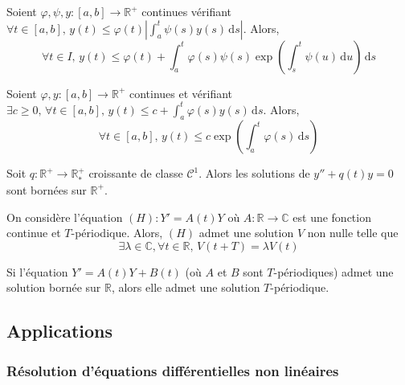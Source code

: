 
  \begin{lemma}
    Soient $\varphi, \psi, y : [a,b] \rightarrow \mathbb{R}^+$ continues vérifiant $\forall t \in [a,b], \, y(t) \leq \varphi(t) \left | \int_a^t \psi(s) y(s) \, \mathrm{d}s \right |$. Alors,
    \[ \forall t \in I, \, y(t) \leq \varphi(t) + \int_a^t \varphi(s) \psi(s) \exp \left( \int_s^t \psi(u) \, \mathrm{d}u \right) \, \mathrm{d}s \]
  \end{lemma}

  \begin{corollary}
    Soient $\varphi, y : [a,b] \rightarrow \mathbb{R}^+$  continues et vérifiant $\exists c \geq 0, \, \forall t \in [a, b], \, y(t) \leq c + \int_a^t \varphi(s) y(s) \, \mathrm{d}s$. Alors,
    \[ \forall t \in [a,b], \, y(t) \leq c \exp \left( \int_a^t \varphi(s) \, \mathrm{d}s \right) \]
  \end{corollary}

  \begin{application}
    Soit $q : \mathbb{R}^+ \rightarrow \mathbb{R}^+_*$ croissante de classe $\mathcal{C}^1$. Alors les solutions de $y'' + q(t) y = 0$ sont bornées sur $\mathbb{R}^+$.
  \end{application}


  \begin{theorem}
    On considère l'équation $(H) : Y' = A(t) Y$ où $A : \mathbb{R} \rightarrow \mathbb{C}$ est une fonction continue et $T$-périodique. Alors, $(H)$ admet une solution $V$ non nulle telle que
    \[ \exists \lambda \in \mathbb{C}, \forall t \in \mathbb{R}, \, V(t+T) = \lambda V(t) \]
  \end{theorem}


  \begin{theorem}
    Si l'équation $Y' = A(t) Y + B(t)$ (où $A$ et $B$ sont $T$-périodiques) admet une solution bornée sur $\mathbb{R}$, alors elle admet une solution $T$-périodique.
  \end{theorem}

  \subsection{Applications}

  \subsubsection{Résolution d'équations différentielles non linéaires}

